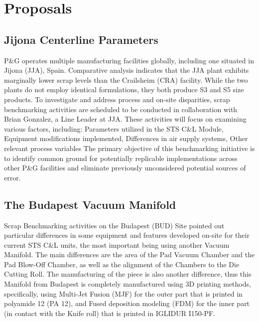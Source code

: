 \chapter{Proposals}\label{Ch3}

\section{Jijona Centerline Parameters}

P\&G operates multiple manufacturing facilities globally, including one situated in Jijona (JJA), Spain. Comparative analysis indicates that the JJA plant exhibits marginally lower scrap levels than the Crailsheim (CRA) facility. While the two plants do not employ identical formulations, they both produce S3 and S5 size products.
To investigate and address process and on-site disparities, scrap benchmarking activities are scheduled to be conducted in collaboration with Brian Gonzalez, a Line Leader at JJA. These activities will focus on examining various factors, including: Parameters utilized in the STS C\&L Module,  Equipment modifications implemented, Differences in air supply systems, Other relevant process variables
The primary objective of this benchmarking initiative is to identify common ground for potentially replicable implementations across other P\&G facilities and eliminate previously unconsidered potential sources of error.


\section{The Budapest Vacuum Manifold}

Scrap Benchmarking activities on the Budapest (BUD) Site pointed out particular differences in some equipment and features developed on-site for their current STS C\&L units, the most important being using another Vacuum Manifold. The main differences are the area of the Pad Vacuum Chamber and the Pad Blow-Off Chamber, as well as the alignment of the Chambers to the Die Cutting Roll. The manufacturing of the piece is also another difference, thus this Manifold from Budapest is completely manufactured using 3D printing methods, specifically, using Multi-Jet Fusion (MJF) for the outer part that is printed in  polyamide 12 (PA 12), and Fused deposition modeling (FDM) for the inner part (in contact with the Knife roll) that is printed in IGLIDUR I150-PF. 


